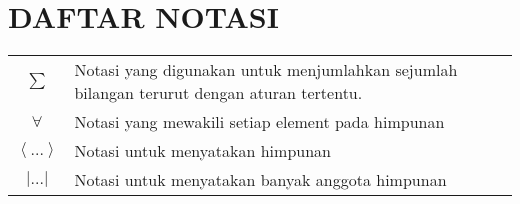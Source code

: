 \chapter{DAFTAR NOTASI}
\begin{tabularx}{\linewidth}{c X}
	$ \sum $ & Notasi yang digunakan untuk menjumlahkan sejumlah bilangan terurut dengan aturan tertentu. \\
	$ \forall $ & Notasi yang mewakili setiap element pada himpunan\\
	$ \left \langle ...\right \rangle$ & Notasi untuk menyatakan himpunan\\
	$ \left | ...  \right |$ & Notasi untuk menyatakan banyak anggota himpunan\\
\end{tabularx}